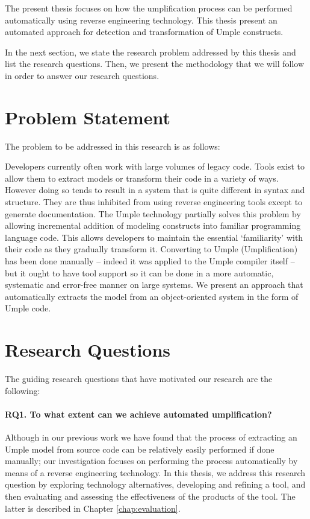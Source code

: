 The present thesis focuses on how the umplification process can be performed automatically using reverse engineering technology. This thesis present an automated approach for detection and transformation of Umple constructs.

In the next section, we state the research problem addressed by this thesis and list the research questions. Then, we present the methodology that we will follow in order to answer our research questions.

\section{Problem Statement}
The problem to be addressed in this research is as follows:

Developers currently often work with large volumes of legacy code. Tools exist to allow them to extract models or transform their code in a variety of ways. However doing so tends to result in a system that is quite different in syntax and structure. They are thus inhibited from using reverse engineering tools except to generate documentation. The Umple technology partially solves this problem by allowing incremental addition of modeling constructs into familiar programming language code. This allows developers to maintain the essential `familiarity' with their code as they gradually transform it. Converting to Umple (Umplification) has been done manually – indeed it was applied to the Umple compiler itself \cite{Lethbridge2010c} –  but it ought to have tool support so it can be done in a more automatic, systematic and error-free manner on large systems. We present an approach that automatically extracts the model from an object-oriented system in the form of Umple code. 

\section{Research Questions}

The guiding research questions that have motivated our research are the following:

\paragraph*{RQ1. To what extent can we achieve automated umplification?}
Although in our previous work we have found that the process of extracting an Umple model from source code can be relatively easily performed if done manually; our investigation focuses on performing the process automatically by means of a reverse engineering technology. 
In this thesis, we address this research question by exploring technology alternatives, developing and refining a tool, and then evaluating and assessing the effectiveness of the products of the tool. The latter is described in Chapter \ref{chap:evaluation}.


